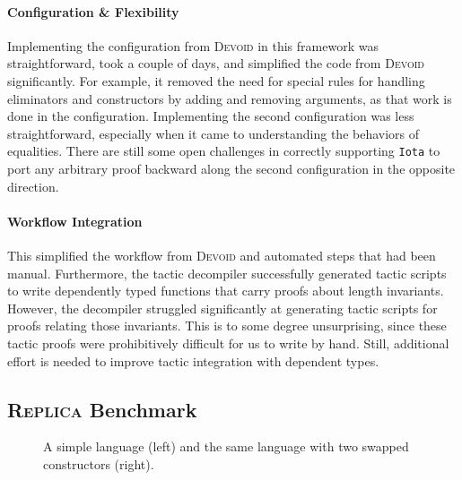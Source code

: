\paragraph{Configuration \& Flexibility}
Implementing the configuration from \textsc{Devoid} in this framework was straightforward,
took a couple of days, and simplified the code from \textsc{Devoid} significantly.
For example, it removed the need for special rules for handling eliminators and constructors
by adding and removing arguments,
as that work is done in the configuration.
Implementing the second configuration was less straightforward,
especially when it came to understanding the behaviors of equalities.
There are still some open challenges in correctly supporting \lstinline{Iota} to port any arbitrary
proof backward along the second configuration in the opposite direction.

\paragraph{Workflow Integration}
This simplified the workflow from \textsc{Devoid} and automated steps that had been manual.
Furthermore, the tactic decompiler successfully generated tactic scripts to write dependently typed
functions that carry proofs about length invariants. %
However, the decompiler struggled significantly at generating tactic scripts for proofs relating those invariants.
This is to some degree unsurprising, since these tactic proofs
were prohibitively difficult for us to write by hand.
Still, additional effort is needed to improve tactic integration with dependent types.

\subsection{\textsc{Replica} Benchmark}
\label{sec:replica}

\begin{figure}
\begin{minipage}{0.48\textwidth}
   
\end{minipage}
\hfill
\begin{minipage}{0.48\textwidth}
   
\end{minipage}
\caption{A simple language (left) and the same language with two swapped constructors (right).}
\label{fig:replica}
\end{figure}

